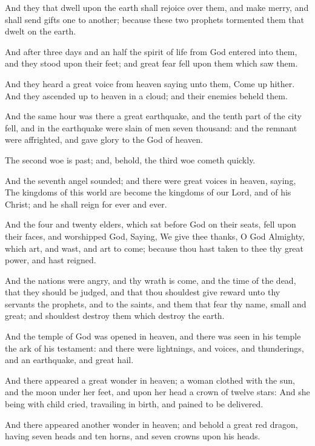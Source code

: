 \Verse And they that dwell upon the earth shall rejoice over them, and make merry, and shall send gifts one to another; because these two prophets tormented them that dwelt on the earth.

\Verse And after three days and an half the spirit of life from God entered into them, and they stood upon their feet; and great fear fell upon them which saw them.

\Verse And they heard a great voice from heaven saying unto them, Come up hither. And they ascended up to heaven in a cloud; and their enemies beheld them.

\Verse And the same hour was there a great earthquake, and the tenth part of the city fell, and in the earthquake were slain of men seven thousand: and the remnant were affrighted, and gave glory to the God of heaven.

\Verse The second woe is past; and, behold, the third woe cometh quickly.

\Verse And the seventh angel sounded; and there were great voices in heaven, saying, The kingdoms of this world are become the kingdoms of our Lord, and of his Christ; and he shall reign for ever and ever.

\Verse And the four and twenty elders, which sat before God on their seats, fell upon their faces, and worshipped God, \Verse Saying, We give thee thanks, O \LORD God Almighty, which art, and wast, and art to come; because thou hast taken to thee thy great power, and hast reigned.

\Verse And the nations were angry, and thy wrath is come, and the time of the dead, that they should be judged, and that thou shouldest give reward unto thy servants the prophets, and to the saints, and them that fear thy name, small and great; and shouldest destroy them which destroy the earth.

\Verse And the temple of God was opened in heaven, and there was seen in his temple the ark of his testament: and there were lightnings, and voices, and thunderings, and an earthquake, and great hail.

\Chapter
\Verse And there appeared a great wonder in heaven; a woman clothed with the sun, and the moon under her feet, and upon her head a crown of twelve stars: \Verse And she being with child cried, travailing in birth, and pained to be delivered.

\Verse And there appeared another wonder in heaven; and behold a great red dragon, having seven heads and ten horns, and seven crowns upon his heads.

